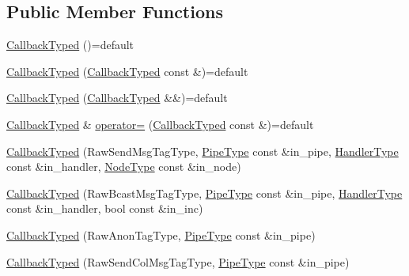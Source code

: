 \subsection*{Public Member Functions}
\begin{DoxyCompactItemize}
\item 
\hyperlink{structvt_1_1pipe_1_1callback_1_1cbunion_1_1_callback_typed_aa4f66e11846b531708eb4c51eaca43fc}{Callback\+Typed} ()=default
\item 
\hyperlink{structvt_1_1pipe_1_1callback_1_1cbunion_1_1_callback_typed_a059f829db7b3d792e7ea78f1a2ce24ab}{Callback\+Typed} (\hyperlink{structvt_1_1pipe_1_1callback_1_1cbunion_1_1_callback_typed}{Callback\+Typed} const \&)=default
\item 
\hyperlink{structvt_1_1pipe_1_1callback_1_1cbunion_1_1_callback_typed_afc499cbc15b193928e02f5ed5c4a98ca}{Callback\+Typed} (\hyperlink{structvt_1_1pipe_1_1callback_1_1cbunion_1_1_callback_typed}{Callback\+Typed} \&\&)=default
\item 
\hyperlink{structvt_1_1pipe_1_1callback_1_1cbunion_1_1_callback_typed}{Callback\+Typed} \& \hyperlink{structvt_1_1pipe_1_1callback_1_1cbunion_1_1_callback_typed_a001cf806e3cd6fec3e07bb698901bacd}{operator=} (\hyperlink{structvt_1_1pipe_1_1callback_1_1cbunion_1_1_callback_typed}{Callback\+Typed} const \&)=default
\item 
\hyperlink{structvt_1_1pipe_1_1callback_1_1cbunion_1_1_callback_typed_a88901f3301dfcebd7e7210185c1a344f}{Callback\+Typed} (Raw\+Send\+Msg\+Tag\+Type, \hyperlink{namespacevt_ac9852acda74d1896f48f406cd72c7bd3}{Pipe\+Type} const \&in\+\_\+pipe, \hyperlink{namespacevt_af64846b57dfcaf104da3ef6967917573}{Handler\+Type} const \&in\+\_\+handler, \hyperlink{namespacevt_a866da9d0efc19c0a1ce79e9e492f47e2}{Node\+Type} const \&in\+\_\+node)
\item 
\hyperlink{structvt_1_1pipe_1_1callback_1_1cbunion_1_1_callback_typed_abee1271009ec78a7f278a8d43a397cc5}{Callback\+Typed} (Raw\+Bcast\+Msg\+Tag\+Type, \hyperlink{namespacevt_ac9852acda74d1896f48f406cd72c7bd3}{Pipe\+Type} const \&in\+\_\+pipe, \hyperlink{namespacevt_af64846b57dfcaf104da3ef6967917573}{Handler\+Type} const \&in\+\_\+handler, bool const \&in\+\_\+inc)
\item 
\hyperlink{structvt_1_1pipe_1_1callback_1_1cbunion_1_1_callback_typed_ac017bd9d99b889d882acb7e9847d0378}{Callback\+Typed} (Raw\+Anon\+Tag\+Type, \hyperlink{namespacevt_ac9852acda74d1896f48f406cd72c7bd3}{Pipe\+Type} const \&in\+\_\+pipe)
\item 
\hyperlink{structvt_1_1pipe_1_1callback_1_1cbunion_1_1_callback_typed_ad455eeb861c8abf6bfba2267dd389a7c}{Callback\+Typed} (Raw\+Send\+Col\+Msg\+Tag\+Type, \hyperlink{namespacevt_ac9852acda74d1896f48f406cd72c7bd3}{Pipe\+Type} const \&in\+\_\+pipe)

\end{DoxyCompactItemize}
